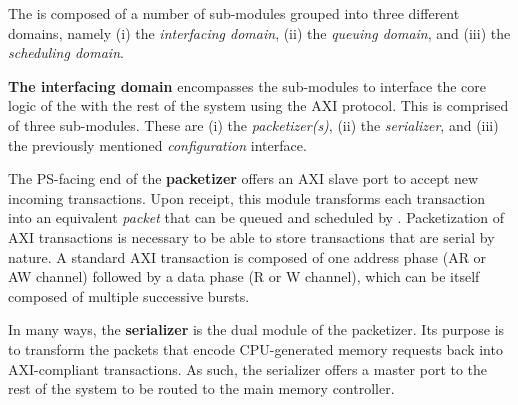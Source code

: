 


The \schim is composed of a number of sub-modules grouped into
three different domains, namely (i) the \emph{interfacing domain},
(ii) the \emph{queuing domain}, and (iii) the \emph{scheduling
domain}.

\par{\bf The interfacing domain} encompasses the sub-modules to
interface the core logic of the \schim with the rest of the system
using the AXI protocol.  This is comprised of three sub-modules. These
are (i) the \emph{packetizer(s)}, (ii) the \emph{serializer}, and
(iii) the previously mentioned \emph{configuration} interface.

The PS-facing end of the {\bf packetizer} offers an AXI slave port to
accept new incoming transactions. Upon receipt, this module transforms
each transaction into an equivalent \emph{packet} that can be queued
and scheduled by \schim. Packetization of AXI
transactions is necessary to be able to store transactions that are
serial by nature.  A standard AXI transaction is composed of
one address phase (AR or AW channel) followed by a data phase (R or W
channel), which can be itself composed of multiple successive bursts.

In many ways, the {\bf serializer} is the dual module of the
packetizer. Its purpose is to transform the packets that encode
CPU-generated memory requests back into AXI-compliant transactions. As
such, the serializer offers a master port to the rest of the system to
be routed to the main memory controller.

